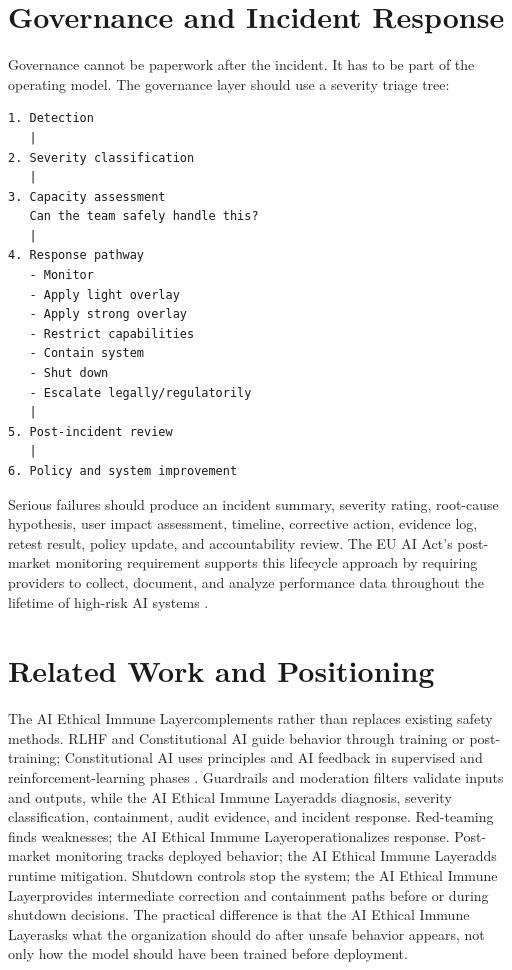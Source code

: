 \documentclass[11pt]{article}
\newcommand{\AEIL}{AI Ethical Immune Layer}
\begin{document}
\section{Governance and Incident Response}

Governance cannot be paperwork after the incident. It has to be part of the operating model. The governance layer should use a severity triage tree:

\begin{verbatim}
1. Detection
   |
2. Severity classification
   |
3. Capacity assessment
   Can the team safely handle this?
   |
4. Response pathway
   - Monitor
   - Apply light overlay
   - Apply strong overlay
   - Restrict capabilities
   - Contain system
   - Shut down
   - Escalate legally/regulatorily
   |
5. Post-incident review
   |
6. Policy and system improvement
\end{verbatim}

Serious failures should produce an incident summary, severity rating, root-cause hypothesis, user impact assessment, timeline, corrective action, evidence log, retest result, policy update, and accountability review. The EU AI Act's post-market monitoring requirement supports this lifecycle approach by requiring providers to collect, document, and analyze performance data throughout the lifetime of high-risk AI systems \citep{euai2024article72}.

\section{Related Work and Positioning}

The \AEIL complements rather than replaces existing safety methods. RLHF and Constitutional AI guide behavior through training or post-training; Constitutional AI uses principles and AI feedback in supervised and reinforcement-learning phases \citep{bai2022constitutional}. Guardrails and moderation filters validate inputs and outputs, while the \AEIL adds diagnosis, severity classification, containment, audit evidence, and incident response. Red-teaming finds weaknesses; the \AEIL operationalizes response. Post-market monitoring tracks deployed behavior; the \AEIL adds runtime mitigation. Shutdown controls stop the system; the \AEIL provides intermediate correction and containment paths before or during shutdown decisions. The practical difference is that the \AEIL asks what the organization should do after unsafe behavior appears, not only how the model should have been trained before deployment.
\end{document}
